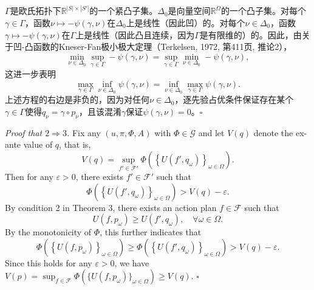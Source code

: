\documentclass[12pt,a4paper]{article}
\newenvironment{original}
  {\par\vspace{4pt}\noindent\color{black}\ignorespaces}
  {\par\vspace{2pt}}
\newenvironment{translation}
  {\par\vspace{2pt}\noindent\color{myblue}\ignorespaces}
  {\par\vspace{6pt}}
\newcommand{\R}{\mathbb{R}}
\newcommand{\Delt}{\Delta}
\newcommand{\calF}{\mathcal{F}}
\begin{document}
\begin{translation}
$\Gamma$是欧氏拓扑下$\R^{|S|\times|S'|}$的一个紧凸子集。$\Delt_0$是向量空间$\R^{\Omega}$的一个凸子集。对每个$\gamma\in\Gamma$，函数$\nu\mapsto -\psi(\gamma,\nu)$在$\Delt_0$上是线性（因此凹）的。对每个$\nu\in\Delt_0$，函数$\gamma\mapsto -\psi(\gamma,\nu)$在$\Gamma$上是线性（因此凸且连续，因为$\Gamma$是有限维的）的。因此，由关于凹-凸函数的Kneser-Fan极小极大定理（Terkelsen, 1972, 第411页, 推论2），
\begin{equation}
    \min_{\nu\in\Delt_0}\sup_{\gamma\in\Gamma} -\psi(\gamma,\nu) = \sup_{\gamma\in\Gamma}\min_{\nu\in\Delt_0} -\psi(\gamma,\nu),
\end{equation}
这进一步表明
\begin{equation}
    \max_{\gamma\in\Gamma}\inf_{\nu\in\Delt_0} \psi(\gamma,\nu) = \inf_{\nu\in\Delt_0}\max_{\gamma\in\Gamma} \psi(\gamma,\nu).
\end{equation}
上述方程的右边是非负的，因为对任何$\nu\in\Delt_0$，逐先验占优条件保证存在某个$\gamma\in\Gamma$使得$q_{\nu}=\gamma\circ p_{\nu}$，且该混淆$\gamma$保证$\psi(\gamma,\nu)=0$。$\square$
\end{translation}

\begin{original}
\textit{Proof that $2\Rightarrow 3$.} Fix any $(u,\pi,\Phi,A)$ with $\Phi\in\mathcal{G}$ and let $V(q)$ denote the ex-ante value of $q$, that is,
\begin{equation}
    V(q) = \sup_{f'\in\calF'} \Phi\left( \left\{ U(f', q_{\omega}) \right\}_{\omega\in\Omega} \right).
\end{equation}
Then for any $\varepsilon>0$, there exists $f'\in\calF'$ such that
\begin{equation}
    \Phi\left( \left\{ U(f', q_{\omega}) \right\}_{\omega\in\Omega} \right) > V(q) - \varepsilon.
\end{equation}
By condition 2 in Theorem 3, there exists an action plan $f\in\calF$ such that
\begin{equation}
    U(f,p_{\omega})\geq U(f',q_{\omega}),\quad\forall\omega\in\Omega.
\end{equation}
By the monotonicity of $\Phi$, this further indicates that
\begin{equation}
    \Phi\left( \left\{ U(f, p_{\omega}) \right\}_{\omega\in\Omega} \right) \geq \Phi\left( \left\{ U(f', q_{\omega}) \right\}_{\omega\in\Omega} \right) > V(q) - \varepsilon.
\end{equation}
Since this holds for any $\varepsilon>0$, we have $V(p)=\sup_{f\in\calF} \Phi(\{U(f, p_{\omega})\}_{\omega\in\Omega}) \geq V(q)$. $\square$
\end{original}
\end{document}

